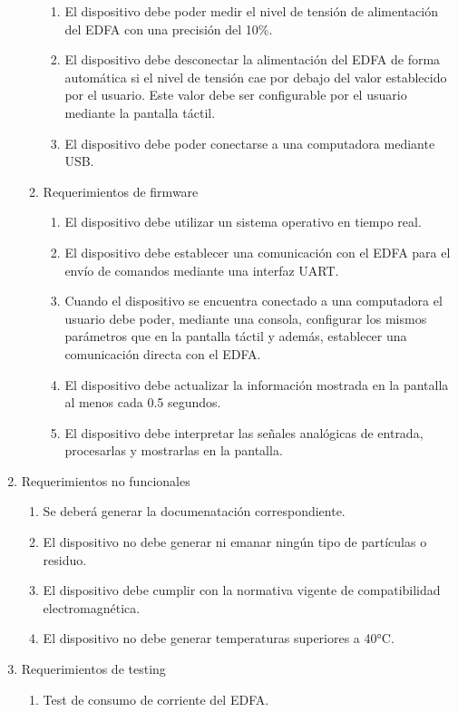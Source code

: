 \documentclass[
11pt, %
]{charter}
\begin{document}
\begin{enumerate}
\begin{enumerate}
\begin{enumerate}[label*=\arabic*.]
					\item El dispositivo debe poder medir el nivel de tensión de alimentación del EDFA con una precisión del 10\%.
					\item El dispositivo debe desconectar la alimentación del EDFA de forma automática si el nivel de tensión cae por debajo del valor establecido por el usuario. Este valor debe ser configurable por el usuario mediante la pantalla táctil.
					\item El dispositivo debe poder conectarse a una computadora mediante USB.
				\end{enumerate}
			\item Requerimientos de firmware
				\begin{enumerate}[label*=\arabic*.]
					\item El dispositivo debe utilizar un sistema operativo en tiempo real.
					\item El dispositivo debe establecer una comunicación con el EDFA para el envío de comandos mediante una interfaz UART.
					\item Cuando el dispositivo se encuentra conectado a una computadora el usuario debe poder, mediante una consola, configurar los mismos parámetros que en la pantalla táctil y además, establecer una comunicación directa con el EDFA.
					\item El dispositivo debe actualizar la información mostrada en la pantalla al menos cada 0.5 segundos.
					\item El dispositivo debe interpretar las señales analógicas de entrada, procesarlas y mostrarlas en la pantalla.
				\end{enumerate}
		\end{enumerate}
	\item Requerimientos no funcionales
		\begin{enumerate}
			\item Se deberá generar la documenatación correspondiente.
			\item El dispositivo no debe generar ni emanar ningún tipo de partículas o residuo.
			\item El dispositivo debe cumplir con la normativa vigente de compatibilidad electromagnética.
			\item El dispositivo no debe generar temperaturas superiores a 40°C.
		\end{enumerate}
	\item Requerimientos de testing
		\begin{enumerate}
			\item Test de consumo de corriente del EDFA.

\end{enumerate}
\end{enumerate}
\end{document}
